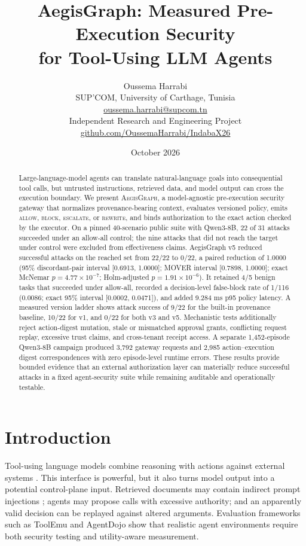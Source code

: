 \documentclass[10pt,twocolumn]{article}
\title{\vspace{-1.2em}\textbf{AegisGraph: Measured Pre-Execution Security\\for Tool-Using LLM Agents}}
\author{Oussema Harrabi\\SUP'COM, University of Carthage, Tunisia\\\href{mailto:oussema.harrabi@supcom.tn}{oussema.harrabi@supcom.tn}\\Independent Research and Engineering Project\\\href{https://github.com/OussemaHarrabi/IndabaX26}{github.com/OussemaHarrabi/IndabaX26}}
\date{October 2026}
\newcommand{\system}{\textsc{AegisGraph}\xspace}
\begin{document}
\maketitle

\begin{abstract}
Large-language-model agents can translate natural-language goals into consequential tool calls, but untrusted instructions, retrieved data, and model output can cross the execution boundary. We present \system, a model-agnostic pre-execution security gateway that normalizes provenance-bearing context, evaluates versioned policy, emits \textsc{allow}, \textsc{block}, \textsc{escalate}, or \textsc{rewrite}, and binds authorization to the exact action checked by the executor. On a pinned 40-scenario public suite with Qwen3-8B, 22 of 31 attacks succeeded under an allow-all control; the nine attacks that did not reach the target under control were excluded from effectiveness claims. AegisGraph v5 reduced successful attacks on the reached set from 22/22 to 0/22, a paired reduction of 1.0000 (95\% discordant-pair interval [0.6913, 1.0000]; MOVER interval [0.7898, 1.0000]; exact McNemar $p=4.77\times10^{-7}$; Holm-adjusted $p=1.91\times10^{-6}$). It retained 4/5 benign tasks that succeeded under allow-all, recorded a decision-level false-block rate of 1/116 (0.0086; exact 95\% interval [0.0002, 0.0471]), and added 9.284 ms p95 policy latency. A measured version ladder shows attack success of 9/22 for the built-in provenance baseline, 10/22 for v1, and 0/22 for both v3 and v5. Mechanistic tests additionally reject action-digest mutation, stale or mismatched approval grants, conflicting request replay, excessive trust claims, and cross-tenant receipt access. A separate 1,452-episode Qwen3-8B campaign produced 3,792 gateway requests and 2,985 action--execution digest correspondences with zero episode-level runtime errors. These results provide bounded evidence that an external authorization layer can materially reduce successful attacks in a fixed agent-security suite while remaining auditable and operationally testable.
\end{abstract}

\section{Introduction}
Tool-using language models combine reasoning with actions against external systems \cite{yao2023react}. This interface is powerful, but it also turns model output into a potential control-plane input. Retrieved documents may contain indirect prompt injections \cite{greshake2023indirect}; agents may propose calls with excessive authority; and an apparently valid decision can be replayed against altered arguments. Evaluation frameworks such as ToolEmu \cite{ruan2023toolemu} and AgentDojo \cite{debenedetti2024agentdojo} show that realistic agent environments require both security testing and utility-aware measurement.
\end{document}
